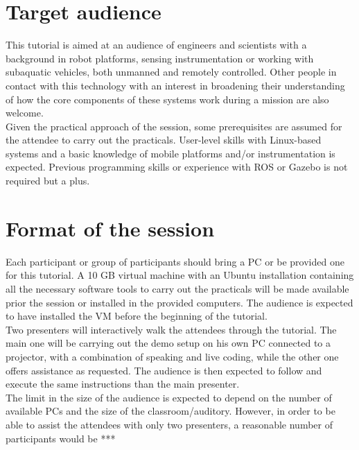\documentclass[
10pt, %
a4paper, %
oneside, %
BCOR5mm, %
]{scrartcl}
\begin{document}

\section{Target audience}
\label{sec:audience}
This tutorial is aimed at an audience of engineers and scientists with a background in robot platforms, sensing instrumentation or working with subaquatic vehicles, both unmanned and remotely controlled.
Other people in contact with this technology with an interest in broadening their understanding of how the core components of these systems work during a mission are also welcome.
\\
Given the practical approach of the session, some prerequisites are assumed for the attendee to carry out the practicals.
User-level skills with Linux-based systems and a basic knowledge of mobile platforms and/or instrumentation is expected.
Previous programming skills or experience with ROS or Gazebo is not required but a plus.


\section{Format of the session}
\label{sec:format}
Each participant or group of participants should bring a PC or be provided one for this tutorial.
A 10 GB virtual machine with an Ubuntu installation containing all the necessary software tools to carry out the practicals will be made available prior the session or installed in the provided computers. 
The audience is expected to have installed the VM before the beginning of the tutorial.
\\
Two presenters will interactively walk the attendees through the tutorial. 
The main one will be carrying out the demo setup on his own PC connected to a projector, with a combination of speaking and live coding, while the other one offers assistance as requested. 
The audience is then expected to follow and execute the same instructions than the main presenter.
\\ 
The limit in the size of the audience is expected to depend on the number of available PCs and the size of the classroom/auditory.
However, in order to be able to assist the attendees with only two presenters, a reasonable number of participants would be ***
\end{document}
